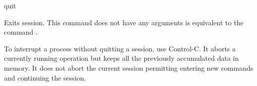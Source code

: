 \begin{command}{quit}{}
	
	\syntax{\obligatory{()}}
	
	\begin{poydescription}
        Exits \poy session. This command does not have any arguments
         is equivalent to the command .
        \end{poydescription}

	\begin{statement}
	 To interrupt a process without quitting a \poy session, use Control-C.
	 It aborts a currently running operation but keeps all the previously accumulated
	 data in memory. It does not abort the current session permitting entering new
	 commands and continuing the session.
	\end{statement}

    \begin{poyexamples}
    \end{poyexamples}
    
    \begin{poyalso}
    \end{poyalso}
\end{command}

